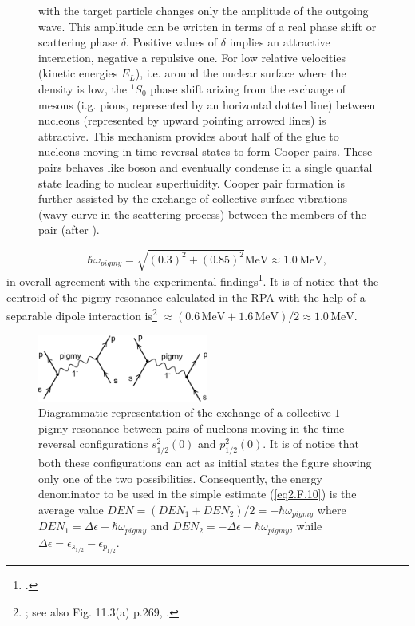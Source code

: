 \begin{figure}
{    with the target particle changes only the amplitude of the outgoing wave. This amplitude can be written in terms of a real phase
    shift  or scattering phase $\delta$. Positive values of $\delta$ implies an attractive interaction, negative a repulsive one. For low relative velocities
    (kinetic energies $E_L$), i.e. around the nuclear surface where the density is low, the $^1S_0$ phase shift arizing from the exchange of mesons
    (i.g. pions, represented by an horizontal dotted  line) between nucleons (represented by upward pointing arrowed lines)
    is attractive. This mechanism provides about half of the glue to nucleons moving in time reversal states to form Cooper pairs. These
    pairs behaves like boson and eventually condense in a single quantal state leading to nuclear superfluidity. Cooper pair formation is
    further assisted by the exchange of collective surface vibrations (wavy curve in the scattering process) between the members of the
    pair (after \cite{Broglia:02d}).}\label{fig1F1}
  \end{figure}
\begin{equation*}
\hbar \omega_{pigmy}=\sqrt{(0.3)^2+(0.85)^2}\text{MeV}\approx 1.0\, \text{MeV},
\end{equation*}  
 in overall agreement with the experimental findings\footnote{\cite{Zinser:97}.}. It is of notice that the centroid of the pigmy resonance calculated in the RPA with the help of a separable dipole interaction is\footnote{\cite{Barranco:01}; see also Fig. 11.3(a) p.269, \cite{Brink:05}.} $\approx (0.6\,\text{MeV}+ 1.6\, \text{MeV})/2\approx 1.0\, \text{MeV}$.
 \begin{figure}
 \centerline{\includegraphics*[width=0.5\textwidth,angle=0]{nutshell/figs/pigmy.pdf}}
 \caption{Diagrammatic representation of the exchange of a collective $1^-$ pigmy resonance between pairs of nucleons moving in the time--reversal configurations $s_{1/2}^2(0)$ and $p_{1/2}^2(0)$. It is of notice that both these configurations can act as initial states  the figure showing only one of the two possibilities. Consequently, the energy denominator to be used in the simple estimate (\ref{eq2.F.10}) is the average value $DEN=(DEN_1+DEN_2)/2=-\hbar\omega_{pigmy}$ where $DEN_1=\Delta \epsilon-\hbar\omega_{pigmy}$ and $DEN_2=-\Delta\epsilon-\hbar\omega_{pigmy}$, while $\Delta\epsilon=\epsilon_{s_{1/2}}-\epsilon_{p_{1/2}}$.}\label{pigmy}
 \end{figure}
